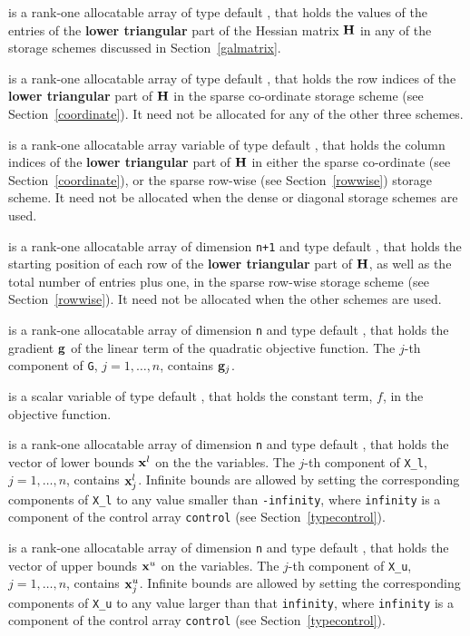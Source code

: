 \documentclass{galahad}
\begin{document}
\begin{description}
\begin{description}
 is a rank-one allocatable array of type default \realdp, that holds
the values of the entries of the {\bf lower triangular} part
of the Hessian matrix ${\mathbf{H}}$ in any of the 
storage schemes discussed in Section~\ref{galmatrix}.

 is a rank-one allocatable array of type default \integer,
that holds the row indices of the {\bf lower triangular} part of ${\mathbf{H}}$ 
in the sparse co-ordinate storage
scheme (see Section~\ref{coordinate}). 
It need not be allocated for any of the other three schemes.

 is a rank-one allocatable array variable of type default \integer,
that holds the column indices of the {\bf lower triangular} part of 
${\mathbf{H}}$ in either the sparse co-ordinate 
(see Section~\ref{coordinate}), or the sparse row-wise 
(see Section~\ref{rowwise}) storage scheme.
It need not be allocated when the dense or diagonal storage schemes are used.

 is a rank-one allocatable array of dimension {\tt n+1} and type 
default \integer, that holds the starting position of 
each row of the {\bf lower triangular} part of ${\mathbf{H}}$, as well
as the total number of entries plus one, in the sparse row-wise storage
scheme (see Section~\ref{rowwise}). It need not be allocated when the
other schemes are used.

\end{description}

 is a rank-one allocatable array of dimension {\tt n} and type 
default \realdp, that holds the gradient ${\mathbf{g}}$ 
of the linear term of the quadratic objective function.
The $j$-th component of 
{\tt G}, $j = 1,  \ldots ,  n$, contains ${\mathbf{g}}_{j}$.

 is a scalar variable of type 
default \realdp, that holds 
the constant term, $f$, in the objective function.

 is a rank-one allocatable array of dimension {\tt n} and type 
default \realdp, that holds
the vector of lower bounds ${\mathbf{x}}^{l}$ on the the variables.
The $j$-th component of {\tt X\_l}, $j = 1, \ldots , n$, 
contains ${\mathbf{x}}_{j}^{l}$.
Infinite bounds are allowed by setting the corresponding 
components of {\tt X\_l} to any value smaller than {\tt -infinity}, 
where {\tt infinity} is a component of the control array {\tt control} 
(see Section~\ref{typecontrol}).

 is a rank-one allocatable array of dimension {\tt n} and type 
default \realdp, that holds
the vector of upper bounds ${\mathbf{x}}^{u}$ on the variables.
The $j$-th component of {\tt X\_u}, $j = 1, \ldots , n$, 
contains ${\mathbf{x}}_{j}^{u}$.
Infinite bounds are allowed by setting the corresponding 
components of {\tt X\_u} to any value larger than that {\tt infinity}, 
where {\tt infinity} is a component of the control array {\tt control} 
(see Section~\ref{typecontrol}).


\end{description}
\end{document}
